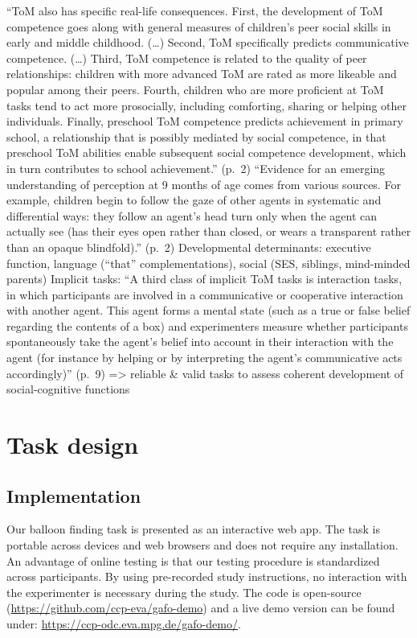 \documentclass[
  man,floatsintext]{apa6}
\begin{document}
``ToM also has specific real-life consequences. First, the development of ToM competence goes along with general measures of children's peer social skills in early and middle childhood. (\ldots) Second, ToM specifically predicts communicative competence. (\ldots) Third, ToM competence is related to the quality of peer relationships: children with more advanced ToM are rated as more likeable and popular among their peers. Fourth, children who are more proficient at ToM tasks tend to act more prosocially, including comforting, sharing or helping other individuals. Finally, preschool ToM competence predicts achievement in primary school, a relationship that is possibly mediated by social competence, in that preschool ToM abilities enable subsequent social competence development, which in turn contributes to school achievement.'' (p.~2)
``Evidence for an emerging understanding of perception at 9 months of age comes from various sources. For example, children begin to follow the gaze of other agents in systematic and differential ways: they follow an agent's head turn only when the agent can actually see (has their eyes open rather than closed, or wears a transparent rather than an opaque blindfold).'' (p.~2)
Developmental determinants: executive function, language (``that'' complementations), social (SES, siblings, mind-minded parents)
Implicit tasks: ``A third class of implicit ToM tasks is interaction tasks, in which participants are involved in a communicative or cooperative interaction with another agent. This agent forms a mental state (such as a true or false belief regarding the contents of a box) and experimenters measure whether participants spontaneously take the agent's belief into account in their interaction with the agent (for instance by helping or by interpreting the agent's communicative acts accordingly)'' (p.~9)
=\textgreater{} reliable \& valid tasks to assess coherent development of social-cognitive functions

\hypertarget{task-design}{%
\section{Task design}\label{task-design}}

\hypertarget{implementation}{%
\subsection{Implementation}\label{implementation}}

Our balloon finding task is presented as an interactive web app. The task is portable across devices and web browsers and does not require any installation. An advantage of online testing is that our testing procedure is standardized across participants. By using pre-recorded study instructions, no interaction with the experimenter is necessary during the study. The code is open-source (\url{https://github.com/ccp-eva/gafo-demo}) and a live demo version can be found under: \url{https://ccp-odc.eva.mpg.de/gafo-demo/}.
\end{document}
